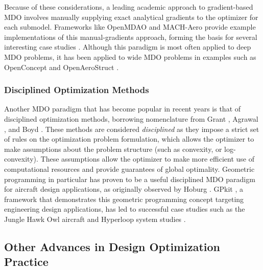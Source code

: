 \documentclass[12pt,vi,oneside,table]{report}
\begin{document}
    Because of these considerations, a leading academic approach to gradient-based MDO involves manually supplying exact analytical gradients to the optimizer for each submodel. Frameworks like OpenMDAO and MACH-Aero \cite{gray_openmdao_2019} provide example implementations of this manual-gradients approach, forming the basis for several interesting case studies \cite{yildirim_performance_2021, brelje_multidisciplinary_2021, openaerostruct, bons_highfidelity_2020}. Although this paradigm is most often applied to deep MDO problems, it has been applied to wide MDO problems in examples such as OpenConcept \cite{brelje_multidisciplinary_2021} and OpenAeroStruct \cite{openaerostruct}.

    \subsubsection{Disciplined Optimization Methods}

    Another MDO paradigm that has become popular in recent years is that of disciplined optimization methods, borrowing nomenclature from Grant \cite{grant_disciplined_2006}, Agrawal \cite{agrawal_disciplined_2019}, and Boyd \cite{boyd_tutorial_2007, boyd_convex_2004}. These methods are considered \textit{disciplined} as they impose a strict set of rules on the optimization problem formulation, which allows the optimizer to make assumptions about the problem structure (such as convexity, or log-convexity). These assumptions allow the optimizer to make more efficient use of computational resources and provide guarantees of global optimality. Geometric programming in particular has proven to be a useful disciplined MDO paradigm for aircraft design applications, as originally observed by Hoburg \cite{hoburg_geometric_2014}. GPkit \cite{gpkit, hoburg_geometric_2014, kirschen}, a framework that demonstrates this geometric programming concept targeting engineering design applications, has led to successful case studies such as the Jungle Hawk Owl aircraft \cite{jho} and Hyperloop system studies \cite{gpkit}.

    \subsection{Other Advances in Design Optimization Practice}

\end{document}
